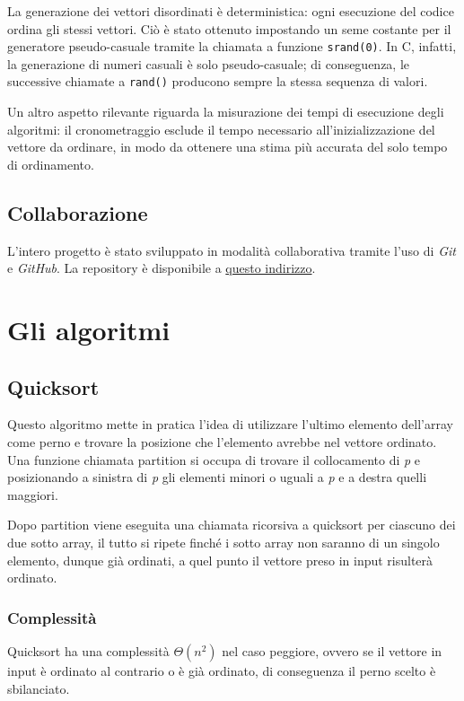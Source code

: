 \documentclass{article}
\begin{document}
        La generazione dei vettori disordinati è deterministica: ogni esecuzione del codice ordina gli stessi vettori. Ciò è stato ottenuto impostando un seme costante per il generatore pseudo-casuale tramite la chiamata a funzione \texttt{srand(0)}. In C, infatti, la generazione di numeri casuali è solo pseudo-casuale; di conseguenza, le successive chiamate a \texttt{rand()} producono sempre la stessa sequenza di valori.

        Un altro aspetto rilevante riguarda la misurazione dei tempi di esecuzione degli algoritmi: il cronometraggio esclude il tempo necessario all’inizializzazione del vettore da ordinare, in modo da ottenere una stima più accurata del solo tempo di ordinamento.

   \subsection{Collaborazione}
    L’intero progetto è stato sviluppato in modalità collaborativa tramite l’uso di \textit{Git} e \textit{GitHub}. La repository è disponibile a \href{https://github.com/BlackHole00/alg_e_str_dati_elaborato}{questo indirizzo}.

\section{Gli algoritmi}
    \subsection{Quicksort}
        Questo algoritmo mette in pratica l'idea di utilizzare l'ultimo elemento dell'array come perno e trovare la posizione che l'elemento avrebbe nel vettore ordinato.\\
        Una funzione chiamata partition si occupa di trovare il collocamento di \textit{p} e posizionando a sinistra di \textit{p} gli elementi minori o uguali a \textit{p} e a destra quelli maggiori.
        
        Dopo partition viene eseguita una chiamata ricorsiva a quicksort per ciascuno dei due sotto array, il tutto si ripete finché i sotto array non saranno di un singolo elemento, dunque già ordinati, a quel punto il vettore preso in input risulterà ordinato.
    
        \subsubsection{Complessità}
            Quicksort ha una complessità $\Theta(n^2)$ nel caso peggiore, ovvero se il vettore in input è ordinato al contrario o è già ordinato, di conseguenza il perno scelto è sbilanciato.
            
\end{document}
